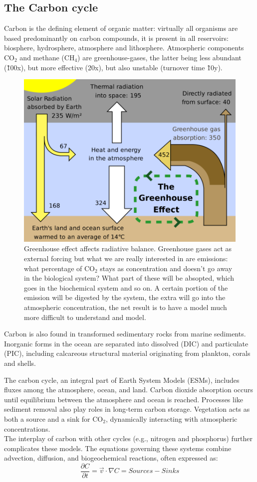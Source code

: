 \subsection{The Carbon cycle}
Carbon is the defining element of organic matter: virtually all organisms are based predominantly on carbon compounds, it is present in all reservoirs: biosphere, hydrosphere, atmosphere and lithosphere. Atmospheric components CO$_2$ and methane (CH$_4$) are greenhouse-gases, the latter being less abundant (\~100x), but more effective (20x), but also unstable (turnover time \~10y).
\begin{figure}[htpb]
	\centering
	\includegraphics[width=0.4\linewidth]{uploads/greenhouse situa.png}
	\caption{Greenhouse effect affects radiative balance. Greenhouse gases act as external forcing but what we are really interested in are emissions: what percentage of CO$_2$ stays as concentration and doesn't go away in the biological system? What part of these will be absopted, which goes in the biochemical system and so on.
		A certain portion of the emission will be digested by the system, the extra will go into the atmospheric concentration, the net result is to have a model much more difficult to understand and model.}
	\label{fig:enter-label}
\end{figure}
Carbon is also found in transformed sedimentary rocks from marine sediments. Inorganic forms in the ocean are separated into dissolved (DIC) and particulate (PIC), including calcareous structural material originating from plankton, corals and shells.

The carbon cycle, an integral part of Earth System Models (ESMs), includes fluxes among the atmosphere, ocean, and land. Carbon dioxide absorption occurs until equilibrium between the atmosphere and ocean is reached. Processes like sediment removal also play roles in long-term carbon storage. Vegetation acts as both a source and a sink for CO$_2$, dynamically interacting with atmospheric concentrations.\\



The interplay of carbon with other cycles (e.g., nitrogen and phosphorus) further complicates these models. The equations governing these systems combine advection, diffusion, and biogeochemical reactions, often expressed as:
$$\frac{\partial C}{\partial t}=\vec{v}\cdot \nabla C=Sources-Sinks$$

